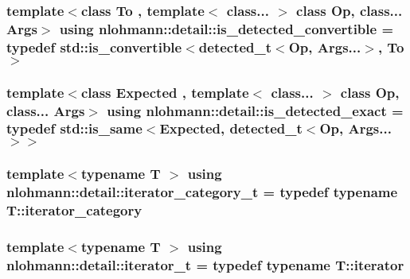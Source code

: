 \subsubsection[{\texorpdfstring{is\+\_\+detected\+\_\+convertible}{is_detected_convertible}}]{\setlength{\rightskip}{0pt plus 5cm}template$<$class To , template$<$ class... $>$ class Op, class... Args$>$ using {\bf nlohmann\+::detail\+::is\+\_\+detected\+\_\+convertible} = typedef std\+::is\+\_\+convertible$<${\bf detected\+\_\+t}$<$Op, Args...$>$, To$>$}\hypertarget{namespacenlohmann_1_1detail_a5262e531c46e357b33007060f294673b}{}\label{namespacenlohmann_1_1detail_a5262e531c46e357b33007060f294673b}
\subsubsection[{\texorpdfstring{is\+\_\+detected\+\_\+exact}{is_detected_exact}}]{\setlength{\rightskip}{0pt plus 5cm}template$<$class Expected , template$<$ class... $>$ class Op, class... Args$>$ using {\bf nlohmann\+::detail\+::is\+\_\+detected\+\_\+exact} = typedef std\+::is\+\_\+same$<$Expected, {\bf detected\+\_\+t}$<$Op, Args...$>$$>$}\hypertarget{namespacenlohmann_1_1detail_aa5a24092e12003ae73ae457b0dd29abd}{}\label{namespacenlohmann_1_1detail_aa5a24092e12003ae73ae457b0dd29abd}
\subsubsection[{\texorpdfstring{iterator\+\_\+category\+\_\+t}{iterator_category_t}}]{\setlength{\rightskip}{0pt plus 5cm}template$<$typename T $>$ using {\bf nlohmann\+::detail\+::iterator\+\_\+category\+\_\+t} = typedef typename T\+::iterator\+\_\+category}\hypertarget{namespacenlohmann_1_1detail_ad22d2aa3aab018050ae519f6754366e1}{}\label{namespacenlohmann_1_1detail_ad22d2aa3aab018050ae519f6754366e1}
\subsubsection[{\texorpdfstring{iterator\+\_\+t}{iterator_t}}]{\setlength{\rightskip}{0pt plus 5cm}template$<$typename T $>$ using {\bf nlohmann\+::detail\+::iterator\+\_\+t} = typedef typename T\+::iterator}\hypertarget{namespacenlohmann_1_1detail_a9ff93db146174305bce1bc4c54703e11}{}\label{namespacenlohmann_1_1detail_a9ff93db146174305bce1bc4c54703e11}
